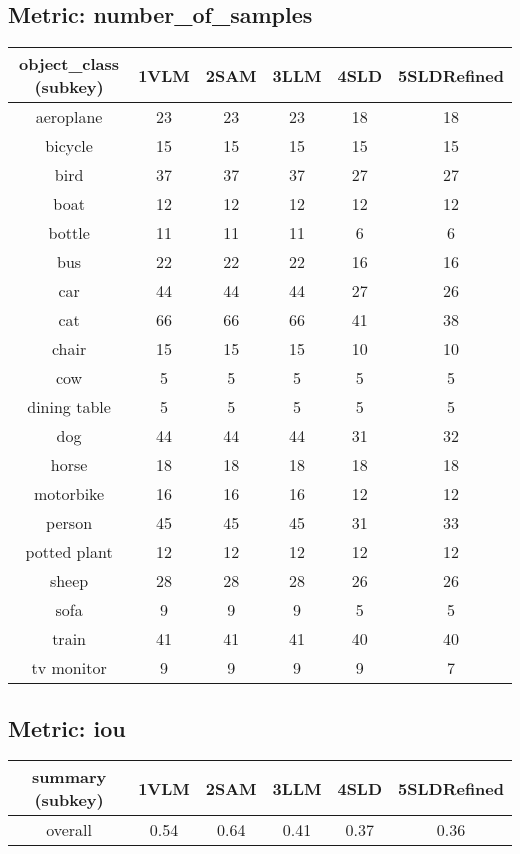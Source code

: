 \subsection*{Metric: number\_of\_samples}
\begin{center}
    \begin{tabular}{cccccc}
        \toprule
        object\_class (subkey) & 1VLM & 2SAM & 3LLM & 4SLD & 5SLDRefined \\
        \midrule
        aeroplane & 23 & 23 & 23 & 18 & 18 \\
        bicycle & 15 & 15 & 15 & 15 & 15 \\
        bird & 37 & 37 & 37 & 27 & 27 \\
        boat & 12 & 12 & 12 & 12 & 12 \\
        bottle & 11 & 11 & 11 & 6 & 6 \\
        bus & 22 & 22 & 22 & 16 & 16 \\
        car & 44 & 44 & 44 & 27 & 26 \\
        cat & 66 & 66 & 66 & 41 & 38 \\
        chair & 15 & 15 & 15 & 10 & 10 \\
        cow & 5 & 5 & 5 & 5 & 5 \\
        dining table & 5 & 5 & 5 & 5 & 5 \\
        dog & 44 & 44 & 44 & 31 & 32 \\
        horse & 18 & 18 & 18 & 18 & 18 \\
        motorbike & 16 & 16 & 16 & 12 & 12 \\
        person & 45 & 45 & 45 & 31 & 33 \\
        potted plant & 12 & 12 & 12 & 12 & 12 \\
        sheep & 28 & 28 & 28 & 26 & 26 \\
        sofa & 9 & 9 & 9 & 5 & 5 \\
        train & 41 & 41 & 41 & 40 & 40 \\
        tv monitor & 9 & 9 & 9 & 9 & 7 \\
        \bottomrule
    \end{tabular}
\end{center}

\subsection*{Metric: iou}
\begin{center}
    \begin{tabular}{cccccc}
        \toprule
        summary (subkey) & 1VLM & 2SAM & 3LLM & 4SLD & 5SLDRefined \\
        \midrule
        overall & 0.54 & 0.64 & 0.41 & 0.37 & 0.36 \\
        \bottomrule
    \end{tabular}
\end{center}

